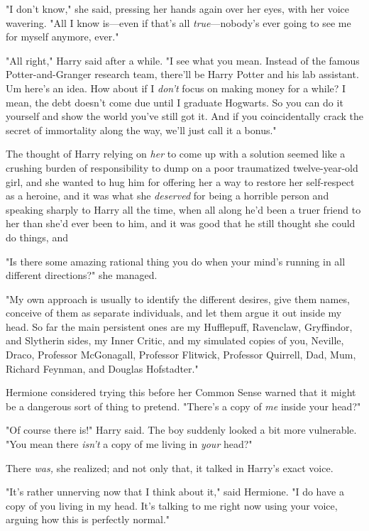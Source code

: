 "I don't know," she said, pressing her hands again over her eyes, with her
voice wavering. "All I know is---even if that's all \emph{true}---nobody's ever
going to see me for myself anymore, ever."

"All right," Harry said after a while. "I see what you mean. Instead of the
famous Potter-and-Granger research team, there'll be Harry Potter and his lab
assistant. Um{\el} here's an idea. How about if I \emph{don't} focus on
making money for a while? I mean, the debt doesn't come due until I graduate
Hogwarts. So you can do it yourself and show the world you've still got it. And
if you coincidentally crack the secret of immortality along the way, we'll just
call it a bonus."

The thought of Harry relying on \emph{her} to come up with a solution
seemed{\el} like a crushing burden of responsibility to dump on a poor
traumatized twelve-year-old girl, and she wanted to hug him for offering her a
way to restore her self-respect as a heroine, and it was what she
\emph{deserved} for being a horrible person and speaking sharply to Harry all
the time, when all along he'd been a truer friend to her than she'd ever been
to him, and it was good that he still thought she could do things, and{\el}

"Is there some amazing rational thing you do when your mind's running in all
different directions?" she managed.

"My own approach is usually to identify the different desires, give them names,
conceive of them as separate individuals, and let them argue it out inside my
head. So far the main persistent ones are my Hufflepuff, Ravenclaw, Gryffindor,
and Slytherin sides, my Inner Critic, and my simulated copies of you, Neville,
Draco, Professor McGonagall, Professor Flitwick, Professor Quirrell, Dad, Mum,
Richard Feynman, and Douglas Hofstadter."

Hermione considered trying this before her Common Sense warned that it might be
a dangerous sort of thing to pretend. "There's a copy of \emph{me} inside your
head?"

"Of course there is!" Harry said. The boy suddenly looked a bit more
vulnerable. "You mean there \emph{isn't} a copy of me living in \emph{your}
head?"

There \emph{was,} she realized; and not only that, it talked in Harry's exact
voice.

"It's rather unnerving now that I think about it," said Hermione. "I do have a
copy of you living in my head. It's talking to me right now using your voice,
arguing how this is perfectly normal."

